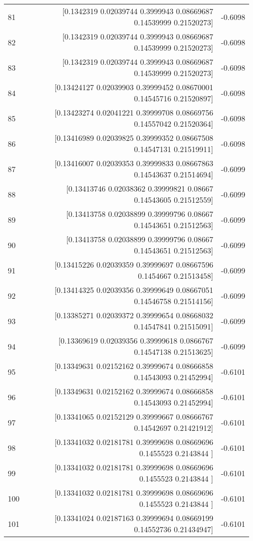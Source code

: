 \begin{longtable}{lrr}
81 & [0.1342319  0.02039744 0.3999943  0.08669687 0.14539999 0.21520273] & -0.6098 \\
82 & [0.1342319  0.02039744 0.3999943  0.08669687 0.14539999 0.21520273] & -0.6098 \\
83 & [0.1342319  0.02039744 0.3999943  0.08669687 0.14539999 0.21520273] & -0.6098 \\
84 & [0.13424127 0.02039903 0.39999452 0.08670001 0.14545716 0.21520897] & -0.6098 \\
85 & [0.13423274 0.02041221 0.39999708 0.08669756 0.14557042 0.21520364] & -0.6098 \\
86 & [0.13416989 0.02039825 0.39999352 0.08667508 0.14547131 0.21519911] & -0.6098 \\
87 & [0.13416007 0.02039353 0.39999833 0.08667863 0.14543637 0.21514694] & -0.6099 \\
88 & [0.13413746 0.02038362 0.39999821 0.08667    0.14543605 0.21512559] & -0.6099 \\
89 & [0.13413758 0.02038899 0.39999796 0.08667    0.14543651 0.21512563] & -0.6099 \\
90 & [0.13413758 0.02038899 0.39999796 0.08667    0.14543651 0.21512563] & -0.6099 \\
91 & [0.13415226 0.02039359 0.39999697 0.08667596 0.1454667  0.21513458] & -0.6099 \\
92 & [0.13414325 0.02039356 0.39999649 0.08667051 0.14546758 0.21514156] & -0.6099 \\
93 & [0.13385271 0.02039372 0.39999654 0.08668032 0.14547841 0.21515091] & -0.6099 \\
94 & [0.13369619 0.02039356 0.39999618 0.0866767  0.14547138 0.21513625] & -0.6099 \\
95 & [0.13349631 0.02152162 0.39999674 0.08666858 0.14543093 0.21452994] & -0.6101 \\
96 & [0.13349631 0.02152162 0.39999674 0.08666858 0.14543093 0.21452994] & -0.6101 \\
97 & [0.13341065 0.02152129 0.39999667 0.08666767 0.14542697 0.21421912] & -0.6101 \\
98 & [0.13341032 0.02181781 0.39999698 0.08669696 0.1455523  0.2143844 ] & -0.6101 \\
99 & [0.13341032 0.02181781 0.39999698 0.08669696 0.1455523  0.2143844 ] & -0.6101 \\
100 & [0.13341032 0.02181781 0.39999698 0.08669696 0.1455523  0.2143844 ] & -0.6101 \\
101 & [0.13341024 0.02187163 0.39999694 0.08669199 0.14552736 0.21434947] & -0.6101 \\

\end{longtable}
